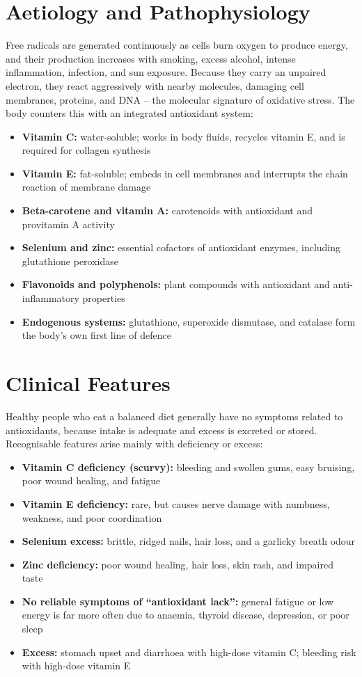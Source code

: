 \section*{Aetiology and Pathophysiology}
Free radicals are generated continuously as cells burn oxygen to produce energy, and their production increases with smoking, excess alcohol, intense inflammation, infection, and sun exposure. Because they carry an unpaired electron, they react aggressively with nearby molecules, damaging cell membranes, proteins, and DNA -- the molecular signature of oxidative stress. The body counters this with an integrated antioxidant system:

\begin{itemize}
    \item \textbf{Vitamin C:} water-soluble; works in body fluids, recycles vitamin E, and is required for collagen synthesis
    \item \textbf{Vitamin E:} fat-soluble; embeds in cell membranes and interrupts the chain reaction of membrane damage
    \item \textbf{Beta-carotene and vitamin A:} carotenoids with antioxidant and provitamin A activity
    \item \textbf{Selenium and zinc:} essential cofactors of antioxidant enzymes, including glutathione peroxidase
    \item \textbf{Flavonoids and polyphenols:} plant compounds with antioxidant and anti-inflammatory properties
    \item \textbf{Endogenous systems:} glutathione, superoxide dismutase, and catalase form the body's own first line of defence
\end{itemize}

\section*{Clinical Features}
Healthy people who eat a balanced diet generally have no symptoms related to antioxidants, because intake is adequate and excess is excreted or stored. Recognisable features arise mainly with deficiency or excess:

\begin{itemize}
    \item \textbf{Vitamin C deficiency (scurvy):} bleeding and swollen gums, easy bruising, poor wound healing, and fatigue
    \item \textbf{Vitamin E deficiency:} rare, but causes nerve damage with numbness, weakness, and poor coordination
    \item \textbf{Selenium excess:} brittle, ridged nails, hair loss, and a garlicky breath odour
    \item \textbf{Zinc deficiency:} poor wound healing, hair loss, skin rash, and impaired taste
    \item \textbf{No reliable symptoms of ``antioxidant lack'':} general fatigue or low energy is far more often due to anaemia, thyroid disease, depression, or poor sleep
    \item \textbf{Excess:} stomach upset and diarrhoea with high-dose vitamin C; bleeding risk with high-dose vitamin E
\end{itemize}


